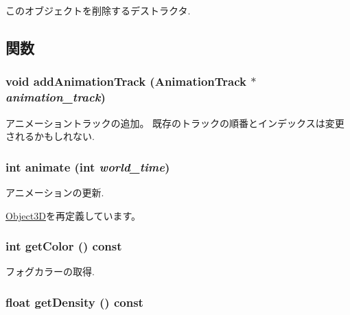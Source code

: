 このオブジェクトを削除するデストラクタ. 

\subsection{関数}
\hypertarget{classm3g_1_1Fog_415c0b110f95410ded9b85e5d99a496b}{
\subsubsection[{addAnimationTrack}]{\setlength{\rightskip}{0pt plus 5cm}void addAnimationTrack ({\bf AnimationTrack} $\ast$ {\em animation\_\-track})}}
\label{classm3g_1_1Fog_415c0b110f95410ded9b85e5d99a496b}


アニメーショントラックの追加。 既存のトラックの順番とインデックスは変更されるかもしれない. \hypertarget{classm3g_1_1Fog_8aad1ceab4c2a03609c8a42324ce484d}{
\subsubsection[{animate}]{\setlength{\rightskip}{0pt plus 5cm}int animate (int {\em world\_\-time})}}
\label{classm3g_1_1Fog_8aad1ceab4c2a03609c8a42324ce484d}


アニメーションの更新. 

\hyperlink{classm3g_1_1Object3D_8aad1ceab4c2a03609c8a42324ce484d}{Object3D}を再定義しています。\hypertarget{classm3g_1_1Fog_4cfa1931c265ec3412fe3f6408a1b4f5}{
\subsubsection[{getColor}]{\setlength{\rightskip}{0pt plus 5cm}int getColor () const}}
\label{classm3g_1_1Fog_4cfa1931c265ec3412fe3f6408a1b4f5}


フォグカラーの取得. \hypertarget{classm3g_1_1Fog_31deef556a6aa5e519d3c79bd9c383c0}{
\subsubsection[{getDensity}]{\setlength{\rightskip}{0pt plus 5cm}float getDensity () const}}
\label{classm3g_1_1Fog_31deef556a6aa5e519d3c79bd9c383c0}


